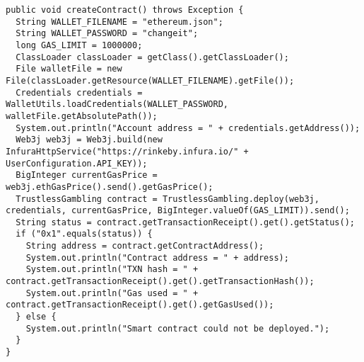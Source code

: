 \begin{lstlisting}[basicstyle=\small]
public void createContract() throws Exception {
  String WALLET_FILENAME = "ethereum.json";
  String WALLET_PASSWORD = "changeit";
  long GAS_LIMIT = 1000000;
  ClassLoader classLoader = getClass().getClassLoader();
  File walletFile = new File(classLoader.getResource(WALLET_FILENAME).getFile());
  Credentials credentials = WalletUtils.loadCredentials(WALLET_PASSWORD, walletFile.getAbsolutePath());
  System.out.println("Account address = " + credentials.getAddress());
  Web3j web3j = Web3j.build(new InfuraHttpService("https://rinkeby.infura.io/" + UserConfiguration.API_KEY));
  BigInteger currentGasPrice = web3j.ethGasPrice().send().getGasPrice();
  TrustlessGambling contract = TrustlessGambling.deploy(web3j, credentials, currentGasPrice, BigInteger.valueOf(GAS_LIMIT)).send();
  String status = contract.getTransactionReceipt().get().getStatus();
  if ("0x1".equals(status)) {
    String address = contract.getContractAddress();
    System.out.println("Contract address = " + address);
    System.out.println("TXN hash = " + contract.getTransactionReceipt().get().getTransactionHash());
    System.out.println("Gas used = " + contract.getTransactionReceipt().get().getGasUsed());
  } else {
    System.out.println("Smart contract could not be deployed.");
  }
}
\end{lstlisting}